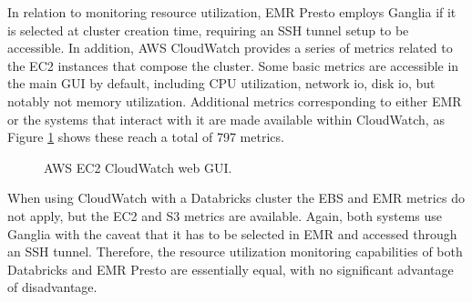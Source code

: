In relation to monitoring resource utilization, EMR Presto employs Ganglia if it is selected at cluster creation time, requiring an SSH tunnel setup to be accessible. In addition, AWS CloudWatch provides a series of metrics related to the EC2 instances that compose the cluster. Some basic metrics are accessible in the main GUI by default, including CPU utilization, network io, disk io, but notably not memory utilization. Additional metrics corresponding to either EMR or the systems that interact with it are made available within CloudWatch, as Figure \ref{fig:cloudWatchaAllMetrics} shows these reach a total of 797 metrics.

\begin{figure}
   \begin{center}
   \end{center}
   \caption{AWS EC2 CloudWatch web GUI.}
   \label{fig:cloudWatchaAllMetrics}
\end{figure}

When using CloudWatch with a Databricks cluster the EBS and EMR metrics do not apply, but the EC2 and S3 metrics are available. Again, both systems use Ganglia with the caveat that it has to be selected in EMR and accessed through an SSH tunnel. Therefore, the resource utilization monitoring capabilities of both Databricks and EMR Presto are essentially equal, with no significant advantage of disadvantage.

